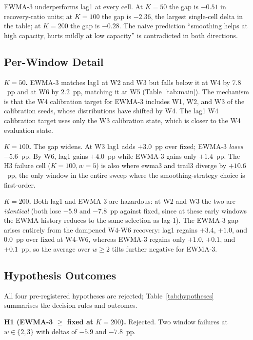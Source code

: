 EWMA-3 underperforms \textsf{lag1} at every cell. At $K = 50$ the
gap is $-0.51$ in recovery-ratio units; at $K = 100$ the gap is
$-2.36$, the largest single-cell delta in the table; at $K = 200$ the
gap is $-0.28$. The naive prediction ``smoothing helps at high
capacity, hurts mildly at low capacity'' is contradicted in both directions.

\subsection{Per-Window Detail}

\textbf{$K = 50$.} EWMA-3 matches \textsf{lag1} at W2 and W3 but
falls below it at W4 by $7.8$~pp and at W6 by $2.2$~pp, matching it
at W5 (Table~\ref{tab:main}). The mechanism is that
the W4 calibration target for EWMA-3 includes W1, W2, and W3 of the
calibration seeds, whose distributions have shifted by W4. The
\textsf{lag1} W4 calibration target uses only the W3 calibration
state, which is closer to the W4 evaluation state.

\textbf{$K = 100$.} The gap widens. At W3 \textsf{lag1} adds
$+3.0$~pp over \textsf{fixed}; EWMA-3 \textit{loses} $-5.6$~pp.
By W6, \textsf{lag1} gains $+4.0$~pp while EWMA-3 gains only
$+1.4$~pp. The H3 failure cell ($K = 100, w = 5$) is also where
\textsf{ewma3} and \textsf{trail3} diverge by $+10.6$~pp, 
the only window in the entire sweep where the smoothing-strategy
choice is first-order.

\textbf{$K = 200$.} Both \textsf{lag1} and EWMA-3 are hazardous: at
W2 and W3 the two are \textit{identical} (both lose $-5.9$ and
$-7.8$~pp against \textsf{fixed}, since at these early windows the
EWMA history reduces to the same selection as lag-1). The EWMA-3 gap
arises entirely from the dampened W4-W6 recovery: \textsf{lag1}
regains $+3.4$, $+1.0$, and $0.0$~pp over \textsf{fixed} at W4-W6,
whereas EWMA-3 regains only $+1.0$, $+0.1$, and $+0.1$~pp, so the
average over $w \geq 2$ tilts further negative for EWMA-3.

\subsection{Hypothesis Outcomes}



All four pre-registered hypotheses are rejected;
Table~\ref{tab:hypotheses} summarises the decision rules and outcomes.

\textbf{H1 (EWMA-3 $\geq$ fixed at $K = 200$).} Rejected. Two
window failures at $w \in \{2, 3\}$ with deltas of $-5.9$ and
$-7.8$~pp.

